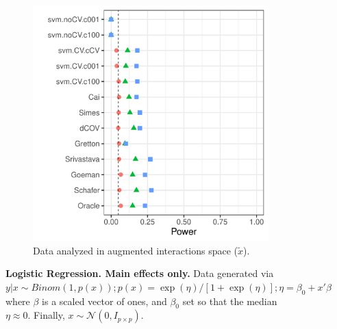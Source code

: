 \documentclass[]{bio}
\begin{document}
\begin{figure}[th]
\begin{subfigure}[t]{.45\columnwidth}
		\includegraphics[width=1\columnwidth]{"art/file44"}
		\caption{Data analyzed in augmented interactions space ($\tilde x$).}
		\label{fig:main-only-augmented-space}
	\end{subfigure}
	\caption{\textbf{Logistic Regression. Main effects only.} 
	Data generated via $y|x \sim Binom(1,p(x));
	p(x)=\exp(\eta)/[1+\exp(\eta)];
	\eta=\beta_0+x'\beta$ where 
	$\beta$ is a scaled vector of ones, and $\beta_0$ set so that the median $\eta \approx0$.
	Finally, $x\sim \mathcal{N}(0,I_{p\times p})$. } 
	\label{fig:logistic-main-only}
\end{figure}
\end{document}
